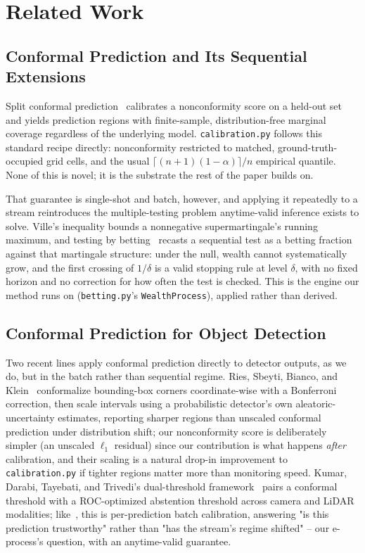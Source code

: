 \section{Related Work}
\label{sec:related}

\subsection{Conformal Prediction and Its Sequential Extensions}

Split conformal prediction~\cite{VovkGammermanShafer2005,Lei2018JASA} calibrates a nonconformity score on a held-out set and yields prediction regions with finite-sample, distribution-free marginal coverage regardless of the underlying model. \texttt{calibration.py} follows this standard recipe directly: nonconformity restricted to matched, ground-truth-occupied grid cells, and the usual $\lceil (n+1)(1-\alpha) \rceil / n$ empirical quantile. None of this is novel; it is the substrate the rest of the paper builds on.

That guarantee is single-shot and batch, however, and applying it repeatedly to a stream reintroduces the multiple-testing problem anytime-valid inference exists to solve. Ville's inequality bounds a nonnegative supermartingale's running maximum, and testing by betting~\cite{WaudbySmithRamdas2024JRSSB,Ramdas2023GameTheoretic} recasts a sequential test as a betting fraction against that martingale structure: under the null, wealth cannot systematically grow, and the first crossing of $1/\delta$ is a valid stopping rule at level $\delta$, with no fixed horizon and no correction for how often the test is checked. This is the engine our method runs on (\texttt{betting.py}'s \texttt{WealthProcess}), applied rather than derived.

\subsection{Conformal Prediction for Object Detection}

Two recent lines apply conformal prediction directly to detector outputs, as we do, but in the batch rather than sequential regime. Ries, Sbeyti, Bianco, and Klein~\cite{Ries2026ProbabilisticOD} conformalize bounding-box corners coordinate-wise with a Bonferroni correction, then scale intervals using a probabilistic detector's own aleatoric-uncertainty estimates, reporting sharper regions than unscaled conformal prediction under distribution shift; our nonconformity score is deliberately simpler (an unscaled $\ell_1$ residual) since our contribution is what happens \emph{after} calibration, and their scaling is a natural drop-in improvement to \texttt{calibration.py} if tighter regions matter more than monitoring speed. Kumar, Darabi, Tayebati, and Trivedi's dual-threshold framework~\cite{Kumar2025DualThreshold} pairs a conformal threshold with a ROC-optimized abstention threshold across camera and LiDAR modalities; like~\cite{Geng2025StateDependent,Kumar2025ContextAware}, this is per-prediction batch calibration, answering "is this prediction trustworthy" rather than "has the stream's regime shifted" -- our e-process's question, with an anytime-valid guarantee.

